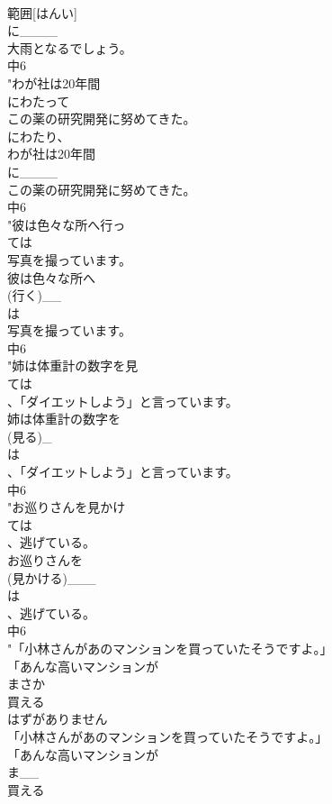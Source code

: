 \documentclass[8pt]{extreport}
\begin{document}
\begin{CJK}{UTF8}{min}
\\	範囲[はんい]
\\	に____
\\	大雨となるでしょう。
\\	中6
\\	"わが社は20年間
\\	にわたって
\\	この薬の研究開発に努めてきた。
\\	にわたり、
\\	わが社は20年間
\\	に____
\\	この薬の研究開発に努めてきた。
\\	中6
\\	"彼は色々な所へ行っ
\\	ては
\\	写真を撮っています。
\\	彼は色々な所へ
\\	(行く)__
\\	は
\\	写真を撮っています。
\\	中6
\\	"姉は体重計の数字を見
\\	ては
\\	、「ダイエットしよう」と言っています。
\\	姉は体重計の数字を
\\	(見る)_
\\	は
\\	、「ダイエットしよう」と言っています。
\\	中6
\\	"お巡りさんを見かけ
\\	ては
\\	、逃げている。
\\	お巡りさんを
\\	(見かける)___
\\	は
\\	、逃げている。
\\	中6
\\	"「小林さんがあのマンションを買っていたそうですよ。」
\\	「あんな高いマンションが
\\	まさか
\\	買える
\\	はずがありません
\\	「小林さんがあのマンションを買っていたそうですよ。」
\\	「あんな高いマンションが
\\	ま__
\\	買える

\end{CJK}
\end{document}
